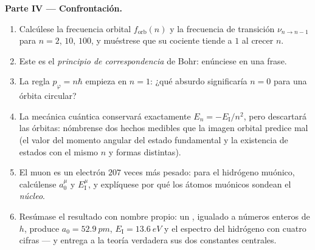 \begin{problem}
\medskip\noindent\textbf{Parte IV --- Confrontación.}
\begin{enumerate}[resume]
  \item Calcúlese la frecuencia orbital $f_{\text{orb}}(n)$ y la
        frecuencia de transición $\nu_{n \to n-1}$ para $n = 2$, $10$,
        $100$, y muéstrese que su cociente tiende a $1$ al crecer $n$.
  \item Este es el \emph{principio de correspondencia} de Bohr:
        enúnciese en una frase.
  \item La regla $p_\varphi = n\hbar$ empieza en $n = 1$: ¿qué absurdo
        significaría $n = 0$ para una órbita circular?
  \item La mecánica cuántica conservará exactamente $E_n = -E_{\text{I}}/n^2$,
        pero descartará las órbitas: nómbrense dos hechos medibles que la
        imagen orbital predice mal (el valor del momento angular del
        estado fundamental y la existencia de estados con el mismo $n$ y
        formas distintas).
  \item El muon es un electrón $207$ veces más pesado: para el hidrógeno
        muónico, calcúlense $a_0^\mu$ y $E_{\text{I}}^\mu$, y explíquese por
        qué los átomos muónicos sondean el \emph{núcleo}.
  \item Resúmase el resultado con nombre propio: un ,
        igualado a números enteros de $h$, produce $a_0 = \qty{52.9}{pm}$,
        $E_{\text{I}} = \qty{13.6}{eV}$ y el espectro del hidrógeno con
        cuatro cifras --- y entrega a la teoría verdadera sus dos
        constantes centrales.
\end{enumerate}
\end{problem}
